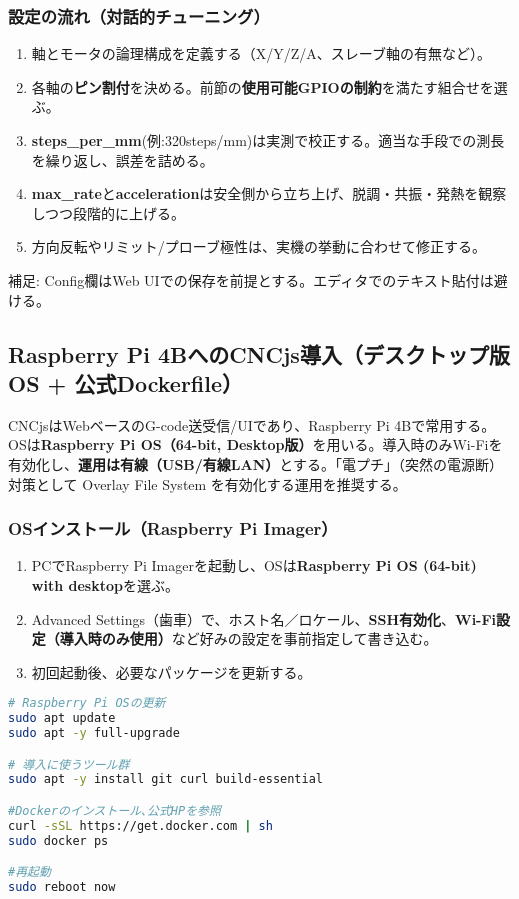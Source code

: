 \documentclass[uplatex,dvipdfmx]{ujarticle}
\begin{document}
\subsubsection*{設定の流れ（対話的チューニング）}
\begin{enumerate}
\item 軸とモータの論理構成を定義する（X/Y/Z/A、スレーブ軸の有無など）。
\item 各軸の\textbf{ピン割付}を決める。前節の\textbf{使用可能GPIOの制約}を満たす組合せを選ぶ。
\item \textbf{steps\_per\_mm}(例:320steps/mm)は実測で校正する。適当な手段での測長を繰り返し、誤差を詰める。
\item \textbf{max\_rate}と\textbf{acceleration}は安全側から立ち上げ、脱調・共振・発熱を観察しつつ段階的に上げる。
\item 方向反転やリミット/プローブ極性は、実機の挙動に合わせて修正する。
\end{enumerate}

\noindent 補足: Config欄はWeb UIでの保存を前提とする。エディタでのテキスト貼付は避ける。

\subsection{Raspberry Pi 4BへのCNCjs導入（デスクトップ版OS + 公式Dockerfile）}

CNCjsはWebベースのG-code送受信/UIであり、Raspberry Pi 4Bで常用する。OSは\textbf{Raspberry Pi OS（64-bit, Desktop版）}を用いる。導入時のみWi-Fiを有効化し、\textbf{運用は有線（USB/有線LAN）}とする。「電プチ」（突然の電源断）対策として Overlay File System を有効化する運用を推奨する。

\subsubsection*{OSインストール（Raspberry Pi Imager）}
\begin{enumerate}
\item PCでRaspberry Pi Imagerを起動し、OSは\textbf{Raspberry Pi OS (64-bit) with desktop}を選ぶ。
\item Advanced Settings（歯車）で、ホスト名／ロケール、\textbf{SSH有効化}、\textbf{Wi-Fi設定（導入時のみ使用）}など好みの設定を事前指定して書き込む。
\item 初回起動後、必要なパッケージを更新する。
\end{enumerate}

\begin{lstlisting}[caption=初期パッケージ導入（APT）, label=code:apt-init, language=bash]
# Raspberry Pi OSの更新
sudo apt update
sudo apt -y full-upgrade

# 導入に使うツール群
sudo apt -y install git curl build-essential 

#Dockerのインストール､公式HPを参照
curl -sSL https://get.docker.com | sh
sudo docker ps

#再起動
sudo reboot now
\end{lstlisting}
\end{document}
